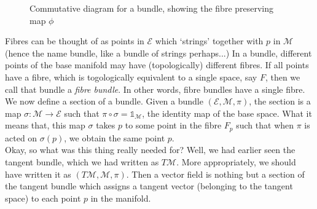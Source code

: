\begin{figure}[H]
  \centering 
  
  \caption{Commutative diagram for a bundle, showing the fibre preserving map $\phi$}
\end{figure}
\noindent
Fibres can be thought of as points in $\mathcal{E}$ which `strings' together with $p$ in $\mathcal{M}$ (hence the name bundle, like a bundle of strings perhaps...) In a bundle, different points of the base manifold may have (topologically) different fibres. If all points have a fibre, which is togologically equivalent to a single space, say $F$, then we call that bundle a \textit{fibre bundle}. In other words, fibre bundles have a single fibre. \\[0.3cm]
We now define a section of a bundle. Given a bundle $(\mathcal{E}, \mathcal{M}, \pi)$, the section is a map $\sigma: \mathcal{M}\rightarrow \mathcal{E}$ such that $\pi \circ \sigma = \mathds{1}_\mathcal{M}$, the identity map of the base space. What it means that, this map $\sigma$ takes $p$ to some point in the fibre $F_p$ such that when $\pi$ is acted on $\sigma(p)$, we obtain the same point $p$.\\[0.2cm]
Okay, so what was this thing really needed for? Well, we had earlier seen the tangent bundle, which we had written as $T\mathcal{M}$. More appropriately, we should have written it as $(T\mathcal{M}, \mathcal{M}, \pi)$. Then a vector field is nothing but a section of the tangent bundle which assigns a tangent vector (belonging to the tangent space) to each point $p$ in the manifold.